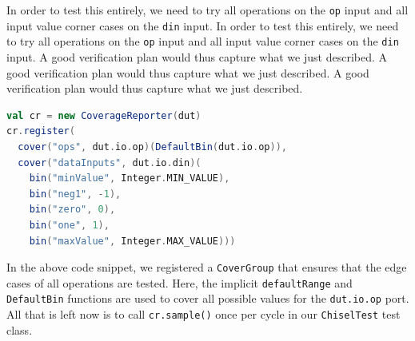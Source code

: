 \documentclass[conference]{IEEEtran}
\begin{document}
 In order to test this entirely, we need to try all operations on the \texttt{op} input and all input value corner cases on the \texttt{din} input. %
In order to test this entirely, we need to try all operations on the \texttt{op} input and all input value corner cases on the \texttt{din} input. %
A good verification plan would thus capture what we just described.  
 A good verification plan would thus capture what we just described.  
A good verification plan would thus capture what we just described.  
\begin{lstlisting}[language=scala] 
val cr = new CoverageReporter(dut)  
cr.register(
  cover("ops", dut.io.op)(DefaultBin(dut.io.op)),
  cover("dataInputs", dut.io.din)(
    bin("minValue", Integer.MIN_VALUE),
    bin("neg1", -1),
    bin("zero", 0),
    bin("one", 1),
    bin("maxValue", Integer.MAX_VALUE)))
\end{lstlisting}
In the above code snippet, we registered a \texttt{CoverGroup} that ensures that the edge cases of all operations are tested.
Here, the implicit \texttt{defaultRange} and \texttt{DefaultBin} functions are used to cover all possible values for the \texttt{dut.io.op} port.
All that is left now is to call \texttt{cr.sample()} once per cycle in our \texttt{ChiselTest} test class.
\end{document}
